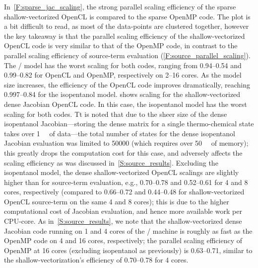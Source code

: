 \documentclass[12pt,number,sort&compress,preprint]{elsarticle}
\begin{document}
In~\cref{F:sparse_jac_scaling}, the strong parallel scaling efficiency of the sparse shallow-vectorized OpenCL is compared to the sparse OpenMP code.
The plot is a bit difficult to read, as most of the data-points are clustered together, however the key takeaway is that the parallel scaling efficiency of the shallow-vectorized OpenCL code is very similar to that of the OpenMP code, in contrast to the parallel scaling efficiency of source-term evaluation (\cref{F:source_parallel_scaling}).
The \slash{} model has the worst scaling for both codes, ranging from \numrange{0.94}{0.54} and \numrange{0.99}{0.82} for OpenCL and OpenMP, respectively on \numrange{2}{16} cores.
As the model size increases, the efficiency of the OpenCL code improves dramatically, reaching \numrange{0.997}{0.84} for the isopentanol model.
 shows scaling for the shallow-vectorized dense Jacobian OpenCL code.
In this case, the isopentanol model has the worst scaling for both codes.
Tt is noted that due to the sheer size of the dense isopentanol Jacobian---storing the dense matrix for a single thermo-chemical state takes over \SI{1}{\mega\byte} of data---the total number of states for the dense isopentanol Jacobian evaluation was limited to \num{50000} (which requires over \SI{50}{\giga\byte} of memory); this greatly drops the computation cost for this case, and adversely affects the scaling efficiency as was discussed in~\cref{S:source_results}.
Excluding the isopentanol model, the dense shallow-vectorized OpenCL scalings are slightly higher than for source-term evaluation, e.g., \numrange{0.70}{0.78} and \numrange{0.52}{0.61} for \num{4} and \num{8} cores, respectively (compared to \numrange{0.66}{0.72} and \numrange{0.44}{0.48} for shallow-vectorized OpenCL source-term on the same \num{4} and \num{8} cores); this is due to the higher computational cost of Jacobian evaluation, and hence more available work per CPU-core.
As in~\cref{S:source_results}, we note that the shallow-vectorized dense Jacobian code running on \num{1} and \num{4} cores of the \avx/ machine is roughly as fast as the OpenMP code on \num{4} and \num{16} cores, respectively; the parallel scaling efficiency of OpenMP at \num{16} cores (excluding isopentanol as previously) is \numrange{0.63}{0.71}, similar to the shallow-vectorization's efficiency of \numrange{0.70}{0.78} for \num{4} cores.
\end{document}
